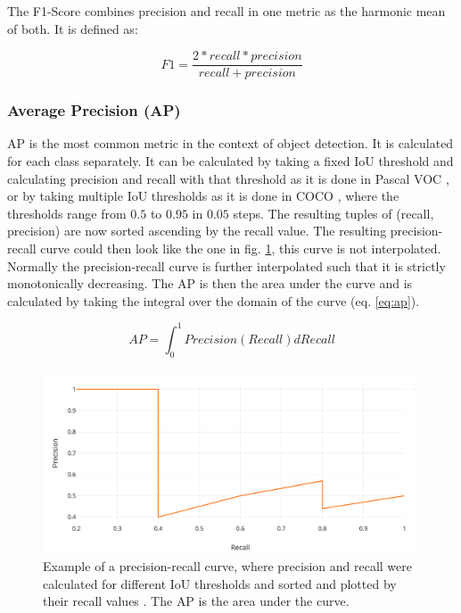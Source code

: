 The F1-Score combines precision and recall in one metric as the harmonic mean of both.
It is defined as:

\begin{equation}
    F1 = \frac{2 * recall * precision}{recall + precision}
\end{equation}

\subsubsection{Average Precision (AP)}

\ac{AP} is the most common metric in the context of object detection. It is calculated for each class separately.
It can be calculated by taking a fixed \ac{IoU} threshold and calculating precision and recall with that threshold as it is done in Pascal VOC \cite{map_pascal_voc}, or by taking multiple \ac{IoU} thresholds as it is done in COCO \cite{map_coco}, where the thresholds range from $0.5$ to $0.95$ in $0.05$ steps.
The resulting tuples of (recall, precision) are now sorted ascending by the recall value.
The resulting precision-recall curve could then look like the one in fig. \ref{fig:pr_curve}, this curve is not interpolated.
Normally the precision-recall curve is further interpolated such that it is strictly monotonically decreasing.
The \ac{AP} is then the area under the curve and is calculated
by taking the integral over the domain of the curve (eq. \ref{eq:ap}).

\begin{equation}
    AP = \int_0^1 Precision(Recall) dRecall
    \label{eq:ap}
\end{equation}

\begin{figure}
\begin{center}
    \includegraphics[width=11cm]{imgs/pr_curve.png}
    \caption{Example of a precision-recall curve, where precision and recall were calculated for different \ac{IoU} thresholds and sorted and plotted by their recall values \cite{map_article}. The \ac{AP} is the area under the curve.}
    \label{fig:pr_curve}
\end{center}
\end{figure}

